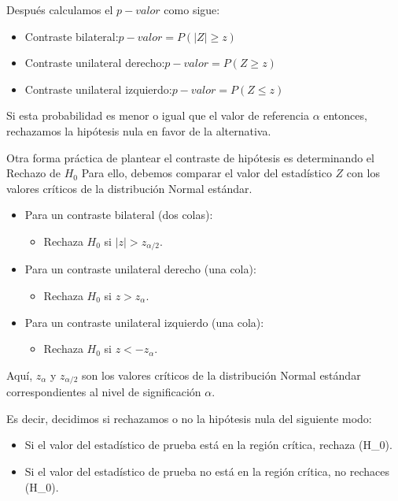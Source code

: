 \documentclass[
  letterpaper,
  DIV=11,
  numbers=noendperiod]{scrreprt}
\providecommand{\tightlist}{%
  \setlength{\itemsep}{0pt}\setlength{\parskip}{0pt}}\usepackage{longtable,booktabs,array}
\begin{document}
Después calculamos el \(p-valor\) como sigue:

\begin{itemize}
\item
  Contraste bilateral:\(p-valor=P(|Z|\geq z)\)
\item
  Contraste unilateral derecho:\(p-valor=P(Z\geq z)\)
\item
  Contraste unilateral izquierdo:\(p-valor=P(Z\leq z)\)
\end{itemize}

Si esta probabilidad es menor o igual que el valor de referencia
\(\alpha\) entonces, rechazamos la hipótesis nula en favor de la
alternativa.

Otra forma práctica de plantear el contraste de hipótesis es
determinando el Rechazo de \(H_0\) Para ello, debemos comparar el valor
del estadístico \(Z\) con los valores críticos de la distribución Normal
estándar.

\begin{itemize}
\tightlist
\item
  Para un contraste bilateral (dos colas):

  \begin{itemize}
  \tightlist
  \item
    Rechaza \(H_0\) si \(|z| > z_{\alpha/2}\).
  \end{itemize}
\item
  Para un contraste unilateral derecho (una cola):

  \begin{itemize}
  \tightlist
  \item
    Rechaza \(H_0\) si \(z > z_{\alpha}\).
  \end{itemize}
\item
  Para un contraste unilateral izquierdo (una cola):

  \begin{itemize}
  \tightlist
  \item
    Rechaza \(H_0\) si \(z < -z_{\alpha}\).
  \end{itemize}
\end{itemize}

Aquí, \(z_{\alpha}\) y \(z_{\alpha/2}\) son los valores críticos de la
distribución Normal estándar correspondientes al nivel de significación
\(\alpha\).

Es decir, decidimos si rechazamos o no la hipótesis nula del siguiente
modo:

\begin{itemize}
\tightlist
\item
  Si el valor del estadístico de prueba está en la región crítica,
  rechaza (H\_0).
\item
  Si el valor del estadístico de prueba no está en la región crítica, no
  rechaces (H\_0).
\end{itemize}
\end{document}
